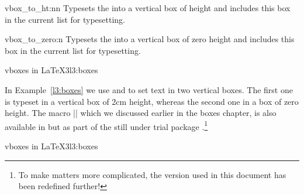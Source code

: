 \begin{docCommand}{vbox_to_ht:nn}{}
Typesets the  into a vertical box of height  and includes this box in the current list for typesetting.
\end{docCommand}

\begin{docCommand}{vbox_to_zero:n}{}
Typesets the  into a vertical box of zero height and includes this box in the current list for typesetting.
\end{docCommand}

\begin{texexample}{vboxes in LaTeX3}{l3:boxes}
\ExplSyntaxOn
    \par
    \par
\ExplSyntaxOff
\vspace*{1cm}
\end{texexample}

In Example~\ref{l3:boxes} we use  and  to set text in two vertical boxes. The first one is typeset in a vertical box of 2cm height, whereas the second one in a box of zero height. The macro
|\fbox| which we discussed earlier in the \latexe boxes chapter, is also available in  but as part of the still under trial package .\footnote{To make matters more complicated, the version used in this document has been redefined further!} 



              
\begin{texexample}{vboxes in LaTeX3}{l3:boxes}
\ExplSyntaxOn
    \par
    \par
\ExplSyntaxOff
\vspace*{1cm}
\end{texexample}

